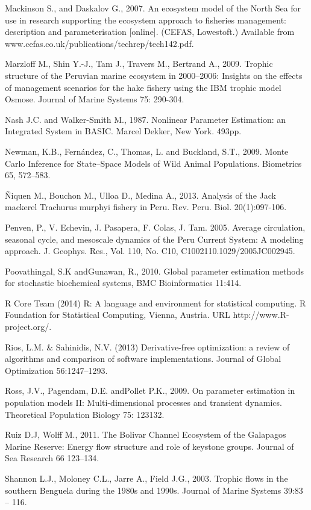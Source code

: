 Mackinson S., and Daskalov G., 2007. An ecosystem model of the North Sea for use in research supporting the ecosystem approach to fisheries management: description and parameterisation [online]. (CEFAS, Lowestoft.) Available from www.cefas.co.uk/publications/techrep/tech142.pdf. 

Marzloff M., Shin Y.-J., Tam J., Travers M., Bertrand A., 2009. Trophic structure of the Peruvian marine ecosystem in 2000–2006: Insights on the effects of management scenarios for the hake fishery using the IBM trophic model Osmose. Journal of Marine Systems 75: 290-304.

Nash J.C. and Walker-Smith M., 1987. Nonlinear Parameter Estimation: an Integrated System in BASIC. Marcel Dekker, New York. 493pp.

Newman, K.B., Fernández, C., Thomas, L. and Buckland, S.T., 2009. Monte Carlo Inference for State–Space Models of Wild Animal Populations. Biometrics 65, 572–583.

Ñiquen M., Bouchon M., Ulloa D., Medina A., 2013. Analysis of the Jack mackerel Trachurus murphyi fishery in Peru. Rev. Peru. Biol. 20(1):097-106. 

Penven, P., V. Echevin, J. Pasapera, F. Colas, J. Tam. 2005. Average circulation, seasonal cycle, and mesoscale dynamics of the Peru Current System: A modeling approach. J. Geophys. Res., Vol. 110, No. C10, C1002110.1029/2005JC002945.

Poovathingal, S.K andGunawan, R., 2010. Global parameter estimation methods for stochastic biochemical systems, BMC Bioinformatics 11:414. 

R Core Team (2014) R: A language and environment for statistical computing. R Foundation for Statistical Computing, Vienna, Austria. URL http://www.R-project.org/.

Rios, L.M. \& Sahinidis, N.V. (2013) Derivative-free optimization: a review of algorithms and comparison of software implementations. Journal of Global Optimization 56:1247–1293.

Ross, J.V., Pagendam, D.E. andPollet P.K., 2009. On parameter estimation in population models II: Multi-dimensional processes and transient dynamics. Theoretical Population Biology 75: 123132.

Ruiz D.J, Wolff M., 2011. The Bolivar Channel Ecosystem of the Galapagos Marine Reserve: Energy flow structure and role of keystone groups. Journal of Sea Research 66 123–134.

Shannon L.J., Moloney C.L., Jarre A., Field J.G., 2003. Trophic flows in the southern Benguela during the 1980s and 1990s. Journal of Marine Systems 39:83 – 116.

